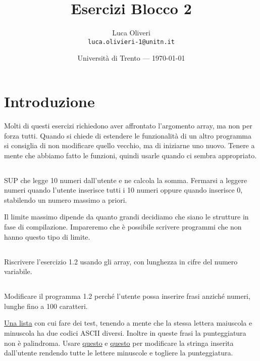 \documentclass{article}
\title{Esercizi Blocco 2} %
\author{Luca Oliveri\\ \texttt{luca.olivieri-1@unitn.it}} %
\date{Università di Trento --- \today} %
\begin{document}
\maketitle %

\section*{Introduzione} %
Molti di questi esercizi richiedono aver affrontato l'argomento array, ma non per forza tutti. Quando si chiede di estendere le funzionalità di un altro programma si consiglia di non modificare quello vecchio, ma di iniziarne uno nuovo. Tenere a mente che abbiamo fatto le funzioni, quindi usarle quando ci sembra appropriato.

\setcounter{section}{2}


\subsection{}
SUP che legge 10 numeri dall'utente e ne calcola la somma. Fermarsi a leggere numeri quando l'utente inserisce tutti i 10 numeri oppure quando inserisce 0, stabilendo un numero massimo a priori.
\begin{info} 
	Il limite massimo dipende da quanto grandi decidiamo che siano le strutture in fase di compilazione. Impareremo che è possibile scrivere programmi che non hanno questo tipo di limite.
\end{info}

\subsection{}
Riscrivere l'esercizio 1.2 usando gli array, con lunghezza in cifre del numero variabile.

\subsection{}
Modificare il programma 1.2 perché l'utente possa inserire frasi anziché numeri, lunghe fino a 100 caratteri. 
\begin{info}
	\href{https://www2.cs.arizona.edu/icon/oddsends/palinsen.htm}{Una lista} con cui fare dei test, tenendo a mente che la stessa lettera maiuscola e minuscola ha due codici ASCII diversi. Inoltre in queste frasi la punteggiatura non è palindroma. Usare \href{http://www.cplusplus.com/reference/cctype/tolower/}{questo} e \href{http://www.cplusplus.com/reference/cctype/ispunct/}{questo} per modificare la stringa inserita dall'utente rendendo tutte le lettere minuscole e togliere la punteggiatura.
\end{info}
\end{document}
